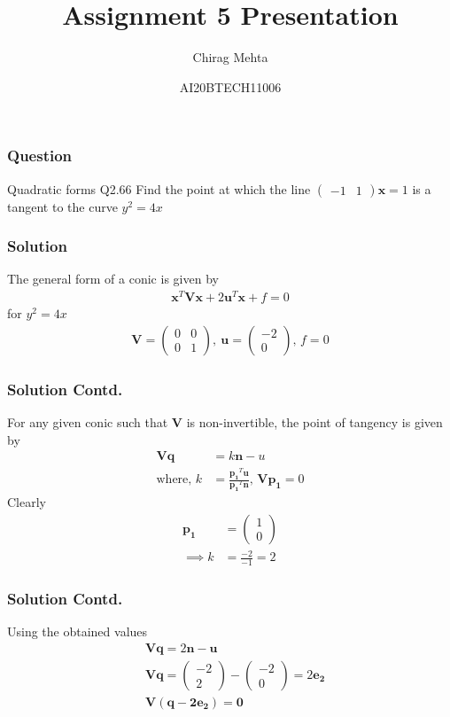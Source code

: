 \documentclass{beamer}
\title{Assignment 5 Presentation}
\author{Chirag Mehta}
\date{AI20BTECH11006}
\newcommand{\myvec}[1]{\ensuremath{\begin{pmatrix}#1\end{pmatrix}}}
\renewcommand{\vec}[1]{\boldsymbol{#1}}
\begin{document}
\begin{frame}
\titlepage
\end{frame}

\begin{frame}
\frametitle{Question}
\begin{block}{Quadratic forms Q2.66}
Find the point at which the line 
$\myvec{-1 & 1}\vec{x}=1$ is a tangent to the curve $y^2=4x$    
\end{block}
\end{frame}

\begin{frame}
\frametitle{Solution}
The general form of a conic is given by
\begin{align}
    \vec{x}^T\vec{Vx}+2\vec{u}^T\vec{x}+f=0 \label{eq:genConic}
\end{align}
for $y^2=4x$
\begin{align}
\vec{V}=\myvec{0 & 0 \\ 0 & 1},\ \vec{u}=\myvec{-2 \\0},\, f=0
\end{align}
\end{frame}

\begin{frame}
\frametitle{Solution Contd.}
For any given conic such that $\vec{V}$ is non-invertible, the point of tangency is given by
\begin{align}
    \vec{Vq}&=k\vec{n}-u \\
    \text{where},\, k& = \frac{\vec{p_1}^T\vec{u}}{\vec{p_1}^T\vec{n}},\, \vec{Vp_1}=0
\end{align}
Clearly
\begin{align}
    \vec{p_1}& =\myvec{1\\0} \\
    \implies k & =\frac{-2}{-1}=2
\end{align}
\end{frame}

\begin{frame}
\frametitle{Solution Contd.}
Using the obtained values
\begin{align}
    &\vec{Vq}=2\vec{n}-\vec{u}\\
    &\vec{Vq}=\myvec{-2\\2}-\myvec{-2\\0}=2\vec{e_2}\\
    &\vec{V}(\vec{q}-\vec{2e_2})=\vec{0} 
\end{align}
\end{frame}
\end{document}
